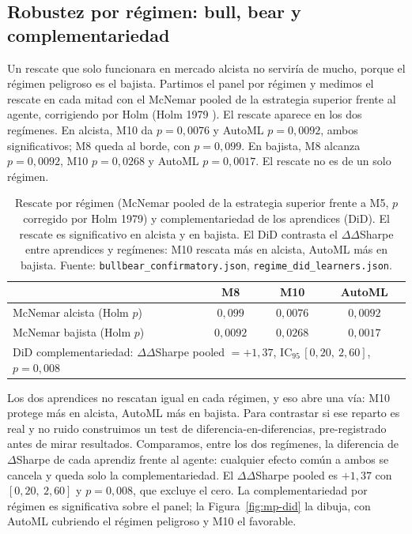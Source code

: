 \subsection{Robustez por régimen: bull, bear y complementariedad}
\label{sec:mp-panel-regimen}

Un rescate que solo funcionara en mercado alcista no serviría de mucho, porque el régimen peligroso es el bajista. Partimos el panel por régimen y medimos el rescate en cada mitad con el McNemar pooled de la estrategia superior frente al agente, corrigiendo por Holm (Holm 1979 \cite{holm1979}). El rescate aparece en los dos regímenes. En alcista, M10 da $p = 0{,}0076$ y AutoML $p = 0{,}0092$, ambos significativos; M8 queda al borde, con $p = 0{,}099$. En bajista, M8 alcanza $p = 0{,}0092$, M10 $p = 0{,}0268$ y AutoML $p = 0{,}0017$. El rescate no es de un solo régimen.

\begin{table}[htbp]
\centering
\caption{Rescate por régimen (McNemar pooled de la estrategia superior frente a M5, $p$ corregido por Holm 1979) y complementariedad de los aprendices (DiD). El rescate es significativo en alcista y en bajista. El DiD contrasta el $\Delta\Delta$Sharpe entre aprendices y regímenes: M10 rescata más en alcista, AutoML más en bajista. Fuente: \texttt{bullbear\_confirmatory.json}, \texttt{regime\_did\_learners.json}.}
\label{tab:mp-regimen}
\begin{tabular}{lccc}
\toprule
 & M8 & M10 & AutoML \\
\midrule
McNemar alcista (Holm $p$) & $0{,}099$ & $0{,}0076$ & $0{,}0092$ \\
McNemar bajista (Holm $p$) & $0{,}0092$ & $0{,}0268$ & $0{,}0017$ \\
\midrule
\multicolumn{4}{l}{DiD complementariedad: $\Delta\Delta$Sharpe pooled $= +1{,}37$, IC$_{95}\,[0{,}20,\ 2{,}60]$, $p = 0{,}008$} \\
\bottomrule
\end{tabular}
\end{table}

Los dos aprendices no rescatan igual en cada régimen, y eso abre una vía: M10 protege más en alcista, AutoML más en bajista. Para contrastar si ese reparto es real y no ruido construimos un test de diferencia-en-diferencias, pre-registrado antes de mirar resultados. Comparamos, entre los dos regímenes, la diferencia de $\Delta$Sharpe de cada aprendiz frente al agente: cualquier efecto común a ambos se cancela y queda solo la complementariedad. El $\Delta\Delta$Sharpe pooled es $+1{,}37$ con $[0{,}20,\ 2{,}60]$ y $p = 0{,}008$, que excluye el cero. La complementariedad por régimen es significativa sobre el panel; la Figura~\ref{fig:mp-did} la dibuja, con AutoML cubriendo el régimen peligroso y M10 el favorable.

